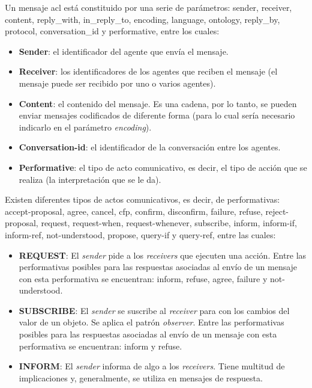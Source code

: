 Un mensaje \acrshort{acl} está constituido por una serie de parámetros: sender, receiver, content, reply\_with, in\_reply\_to, encoding, language, ontology, reply\_by, protocol, conversation\_id y performative, entre los cuales:
\begin{itemize}
    \item \textbf{Sender}: el identificador del agente que envía el mensaje.
    \item \textbf{Receiver}: los identificadores de los agentes que reciben el mensaje (el mensaje puede ser recibido por uno o varios agentes).
    \item \textbf{Content}: el contenido del mensaje. Es una cadena, por lo tanto, se pueden enviar mensajes codificados de diferente forma (para lo cual sería necesario indicarlo en el parámetro \textit{encoding}).
    \item \textbf{Conversation-id}: el identificador de la conversación entre los agentes.
    \item \textbf{Performative}: el tipo de acto comunicativo, es decir, el tipo de acción que se realiza (la interpretación que se le da).
\end{itemize}
 Existen diferentes tipos de actos comunicativos, es decir, de performativas: accept-proposal, agree, cancel, cfp, confirm, disconfirm, failure, refuse, reject-proposal, request, request-when, request-whenever, subscribe, inform, inform-if, inform-ref, not-understood, propose, query-if y query-ref, entre las cuales:
 \begin{itemize}
     \item \textbf{REQUEST}: El \textit{sender} pide a los \textit{receivers} que ejecuten una acción. Entre las performativas posibles para las respuestas asociadas al envío de un mensaje con esta performativa se encuentran: inform, refuse, agree, failure y not-understood.
     \item \textbf{SUBSCRIBE}: El \textit{sender} se suscribe al \textit{receiver} para con los cambios del valor de un objeto. Se aplica el patrón \textit{observer}. Entre las performativas posibles para las respuestas asociadas al envío de un mensaje con esta performativa se encuentran: inform y refuse.
     \item \textbf{INFORM}: El \textit{sender} informa de algo a los \textit{receivers}. Tiene multitud de implicaciones y, generalmente, se utiliza en mensajes de respuesta.
 \end{itemize}
 

\cite{dba2122, fipa}

